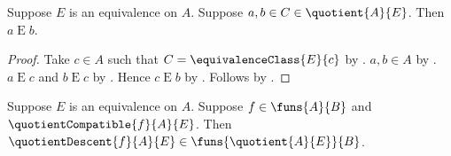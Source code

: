 \begin{lemma}\label{quotient_common_class_equivalent}
    Suppose $E$ is an equivalence on $A$.
    Suppose $a,b\in C\in\quotient{A}{E}$.
    Then $a\mathrel{E}b$.
\end{lemma}
\begin{proof}
    Take $c\in A$ such that $C=\equivalenceClass{E}{c}$ by
        .
    $a,b\in A$ by .
    $a\mathrel{E}c$ and $b\mathrel{E}c$ by
        .
    Hence $c\mathrel{E}b$ by .
    Follows by .
\end{proof}

\begin{theorem}\label{quotient_descent_type}
    Suppose $E$ is an equivalence on $A$.
    Suppose $f\in\funs{A}{B}$ and $\quotientCompatible{f}{A}{E}$.
    Then $\quotientDescent{f}{A}{E}\in
        \funs{\quotient{A}{E}}{B}$.
\end{theorem}
